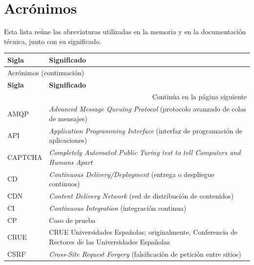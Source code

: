 \chapter*{Acrónimos}

Esta lista reúne las abreviaturas utilizadas en la memoria y en la documentación
técnica, junto con su significado.

\begingroup
\small
\setlength{\tabcolsep}{4pt}
\begin{longtable}{p{}p{}}
\toprule
\textbf{Sigla} & \textbf{Significado}\\
\midrule
\endfirsthead

\multicolumn{2}{l}{\small Acrónimos (continuación)}\\
\toprule
\textbf{Sigla} & \textbf{Significado}\\
\midrule
\endhead

\midrule
\multicolumn{2}{r}{\small Continúa en la página siguiente}\\
\endfoot

\bottomrule
\endlastfoot

AMQP &
\emph{Advanced Message Queuing Protocol} (protocolo avanzado de colas de mensajes)\\

API &
\emph{Application Programming Interface} (interfaz de programación de aplicaciones)\\

CAPTCHA &
\emph{Completely Automated Public Turing test to tell Computers and Humans Apart}\\

CD &
\emph{Continuous Delivery/Deployment} (entrega o despliegue continuos)\\

CDN &
\emph{Content Delivery Network} (red de distribución de contenidos)\\

CI &
\emph{Continuous Integration} (integración continua)\\

CP &
Caso de prueba\\

CRUE &
CRUE Universidades Españolas; originalmente, Conferencia de Rectores de las Universidades Españolas\\

CSRF &
\emph{Cross-Site Request Forgery} (falsificación de petición entre sitios)\\


\end{longtable}
